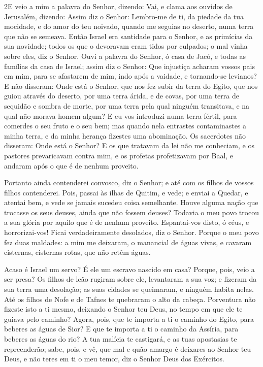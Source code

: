 \medskip

\lettrine{2} E veio a mim a palavra do Senhor, dizendo:
Vai, e clama aos ouvidos de Jerusalém, dizendo: Assim diz o
Senhor: Lembro-me de ti, da piedade da tua mocidade, e do amor do
teu noivado, quando me seguias no deserto, numa terra que não se
semeava. Então Israel era santidade para o Senhor, e as
primícias da sua novidade; todos os que o devoravam eram tidos por
culpados; o mal vinha sobre eles, diz o Senhor. Ouvi a palavra
do Senhor, ó casa de Jacó, e todas as famílias da casa de Israel;
assim diz o Senhor: Que injustiça acharam vossos pais em mim,
para se afastarem de mim, indo após a vaidade, e tornando-se
levianos? E não disseram: Onde está o Senhor, que nos fez subir
da terra do Egito, que nos guiou através do deserto, por uma terra
árida, e de covas, por uma terra de sequidão e sombra de morte, por
uma terra pela qual ninguém transitava, e na qual não morava homem
algum? E eu vos introduzi numa terra fértil, para comerdes o seu
fruto e o seu bem; mas quando nela entrastes contaminastes a minha
terra, e da minha herança fizestes uma abominação. Os sacerdotes
não disseram: Onde está o Senhor? E os que tratavam da lei não me
conheciam, e os pastores prevaricavam contra mim, e os profetas
profetizavam por Baal, e andaram após o que é de nenhum proveito.

Portanto ainda contenderei convosco, diz o Senhor; e até com os
filhos de vossos filhos contenderei. Pois, passai às ilhas de
Quitim, e vede; e enviai a Quedar, e atentai bem, e vede se jamais
sucedeu coisa semelhante. Houve alguma nação que trocasse os
seus deuses, ainda que não fossem deuses? Todavia o meu povo trocou
a sua glória por aquilo que é de nenhum proveito.
Espantai-vos disto, ó céus, e horrorizai-vos! Ficai
verdadeiramente desolados, diz o Senhor. Porque o meu povo
fez duas maldades: a mim me deixaram, o manancial de águas vivas, e
cavaram cisternas, cisternas rotas, que não retêm águas.

Acaso é Israel um servo? É ele um escravo nascido em casa?
Porque, pois, veio a ser presa? Os filhos de leão rugiram
sobre ele, levantaram a sua voz; e fizeram da sua terra uma
desolação; as suas cidades se queimaram, e ninguém habita nelas.
Até os filhos de Nofe e de Tafnes te quebraram o alto da
cabeça. Porventura não fizeste isto a ti mesmo, deixando o
Senhor teu Deus, no tempo em que ele te guiava pelo caminho?
Agora, pois, que te importa a ti o caminho do Egito, para
beberes as águas de Sior? E que te importa a ti o caminho da
Assíria, para beberes as águas do rio? A tua malícia te
castigará, e as tuas apostasias te repreenderão; sabe, pois, e vê,
que mal e quão amargo é deixares ao Senhor teu Deus, e não teres em
ti o meu temor, diz o Senhor Deus dos Exércitos.

